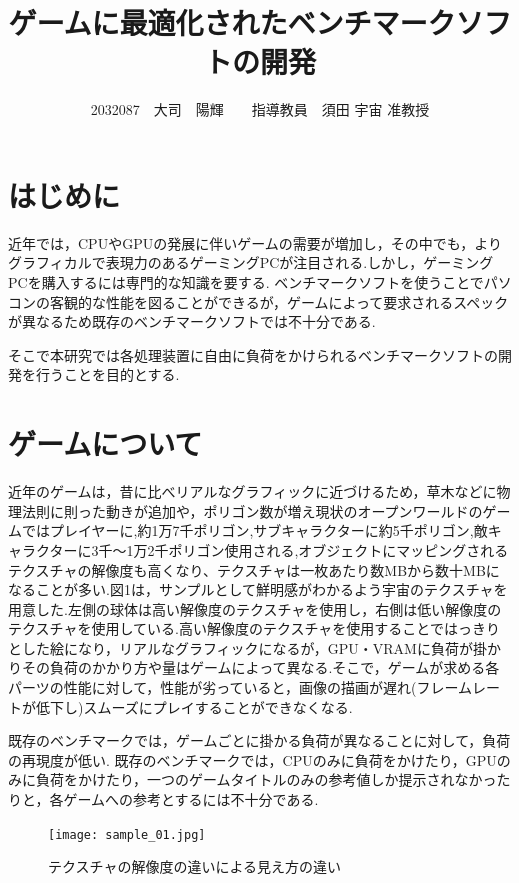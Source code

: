 \documentclass[twocolumn,10pt,a4j]{ltjsarticle}
\title{ゲームに最適化されたベンチマークソフトの開発}
\author{2032087　大司　陽輝　　指導教員　須田 宇宙 准教授}
\date{}
\begin{document}
\maketitle

\section{はじめに}
近年では，CPUやGPUの発展に伴いゲームの需要が増加し，その中でも，よりグラフィカルで表現力のあるゲーミングPCが注目される.しかし，ゲーミングPCを購入するには専門的な知識を要する.
ベンチマークソフトを使うことでパソコンの客観的な性能を図ることができるが，ゲームによって要求されるスペックが異なるため既存のベンチマークソフトでは不十分である.

そこで本研究では各処理装置に自由に負荷をかけられるベンチマークソフトの開発を行うことを目的とする.

\section{ゲームについて}
近年のゲームは，昔に比べリアルなグラフィックに近づけるため，草木などに物理法則に則った動きが追加や，ポリゴン数が増え現状のオープンワールドのゲームではプレイヤーに,約1万7千ポリゴン,サブキャラクターに約5千ポリゴン,敵キャラクターに3千～1万2千ポリゴン使用される,オブジェクトにマッピングされるテクスチャの解像度も高くなり、テクスチャは一枚あたり数MBから数十MBになることが多い.図1は，サンプルとして鮮明感がわかるよう宇宙のテクスチャを用意した.左側の球体は高い解像度のテクスチャを使用し，右側は低い解像度のテクスチャを使用している.高い解像度のテクスチャを使用することではっきりとした絵になり，リアルなグラフィックになるが，GPU・VRAMに負荷が掛かりその負荷のかかり方や量はゲームによって異なる.そこで，ゲームが求める各パーツの性能に対して，性能が劣っていると，画像の描画が遅れ(フレームレートが低下し)スムーズにプレイすることができなくなる.%

既存のベンチマークでは，ゲームごとに掛かる負荷が異なることに対して，負荷の再現度が低い.
既存のベンチマークでは，CPUのみに負荷をかけたり，GPUのみに負荷をかけたり，一つのゲームタイトルのみの参考値しか提示されなかったりと，各ゲームへの参考とするには不十分である.

\begin{figure}[H]
\begin{center}
 \texttt{[image: sample\_01.jpg]}
\end{center}
 \caption{テクスチャの解像度の違いによる見え方の違い}
 \label{fig:図1}
\end{figure}
\vspace{-2mm}
\end{document}
